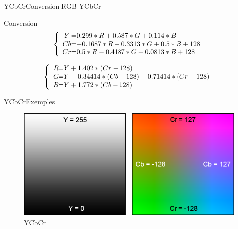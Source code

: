 \begin{frame}{YCbCr}{Conversion RGB YCbCr}

\begin{exampleblock}{Conversion}
\[
 \left \{
 \begin{array}{c @{=} l}
	Y & 0.299 * R + 0.587 * G + 0.114 * B \\
	Cb & -0.1687 * R - 0.3313 * G + 0.5 * B + 128 \\
	Cr & 0.5 * R - 0.4187 * G - 0.0813 * B + 128 \\
 \end{array}
 \right.
\]

\[
 \left \{
 \begin{array}{c @{=} l}
	R & Y + 1.402 * (Cr - 128) \\
	G & Y - 0.34414 * (Cb - 128) - 0.71414 * (Cr - 128) \\
	B & Y + 1.772 * (Cb - 128) \\
 \end{array}
 \right.
\]
\end{exampleblock}

\end{frame}

\begin{frame}{YCbCr}{Exemples}

\begin{figure}
      \centering
      \includegraphics[scale=0.5]{images/YCbCr.png}
      \caption{YCbCr}
\end{figure}

\end{frame}

